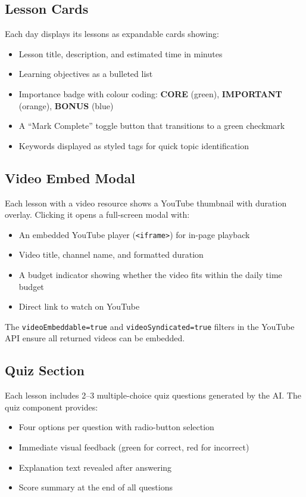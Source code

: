 \documentclass[12pt,a4paper]{report}
\begin{document}
\subsection{Lesson Cards}
Each day displays its lessons as expandable cards showing:
\begin{itemize}[noitemsep]
    \item Lesson title, description, and estimated time in minutes
    \item Learning objectives as a bulleted list
    \item Importance badge with colour coding: \textcolor{green!60!black}{\textbf{CORE}} (green), \textcolor{orange!80!black}{\textbf{IMPORTANT}} (orange), \textcolor{blue!60!black}{\textbf{BONUS}} (blue)
    \item A ``Mark Complete'' toggle button that transitions to a green checkmark
    \item Keywords displayed as styled tags for quick topic identification
\end{itemize}

\subsection{Video Embed Modal}
Each lesson with a video resource shows a YouTube thumbnail with duration overlay. Clicking it opens a full-screen modal with:
\begin{itemize}[noitemsep]
    \item An embedded YouTube player (\texttt{<iframe>}) for in-page playback
    \item Video title, channel name, and formatted duration
    \item A budget indicator showing whether the video fits within the daily time budget
    \item Direct link to watch on YouTube
\end{itemize}
The \texttt{videoEmbeddable=true} and \texttt{videoSyndicated=true} filters in the YouTube API ensure all returned videos can be embedded.

\subsection{Quiz Section}
Each lesson includes 2--3 multiple-choice quiz questions generated by the AI. The quiz component provides:
\begin{itemize}[noitemsep]
    \item Four options per question with radio-button selection
    \item Immediate visual feedback (green for correct, red for incorrect)
    \item Explanation text revealed after answering
    \item Score summary at the end of all questions
\end{itemize}
\end{document}
